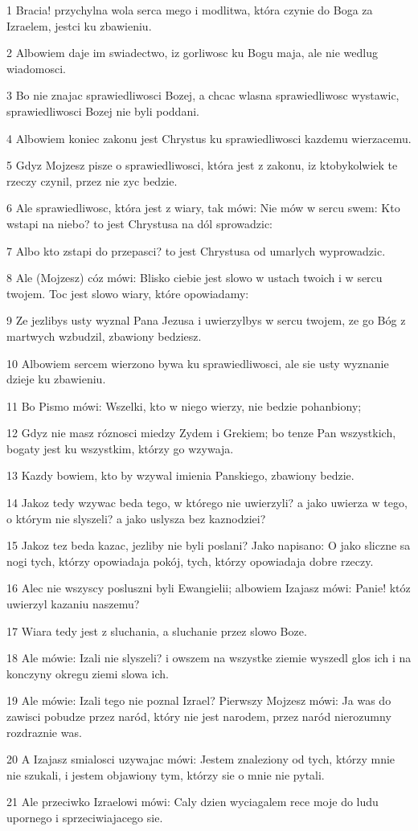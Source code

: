 \par 1 Bracia! przychylna wola serca mego i modlitwa, która czynie do Boga za Izraelem, jestci ku zbawieniu.
\par 2 Albowiem daje im swiadectwo, iz gorliwosc ku Bogu maja, ale nie wedlug wiadomosci.
\par 3 Bo nie znajac sprawiedliwosci Bozej, a chcac wlasna sprawiedliwosc wystawic, sprawiedliwosci Bozej nie byli poddani.
\par 4 Albowiem koniec zakonu jest Chrystus ku sprawiedliwosci kazdemu wierzacemu.
\par 5 Gdyz Mojzesz pisze o sprawiedliwosci, która jest z zakonu, iz ktobykolwiek te rzeczy czynil, przez nie zyc bedzie.
\par 6 Ale sprawiedliwosc, która jest z wiary, tak mówi: Nie mów w sercu swem: Kto wstapi na niebo? to jest Chrystusa na dól sprowadzic:
\par 7 Albo kto zstapi do przepasci? to jest Chrystusa od umarlych wyprowadzic.
\par 8 Ale (Mojzesz) cóz mówi: Blisko ciebie jest slowo w ustach twoich i w sercu twojem. Toc jest slowo wiary, które opowiadamy:
\par 9 Ze jezlibys usty wyznal Pana Jezusa i uwierzylbys w sercu twojem, ze go Bóg z martwych wzbudzil, zbawiony bedziesz.
\par 10 Albowiem sercem wierzono bywa ku sprawiedliwosci, ale sie usty wyznanie dzieje ku zbawieniu.
\par 11 Bo Pismo mówi: Wszelki, kto w niego wierzy, nie bedzie pohanbiony;
\par 12 Gdyz nie masz róznosci miedzy Zydem i Grekiem; bo tenze Pan wszystkich, bogaty jest ku wszystkim, którzy go wzywaja.
\par 13 Kazdy bowiem, kto by wzywal imienia Panskiego, zbawiony bedzie.
\par 14 Jakoz tedy wzywac beda tego, w którego nie uwierzyli? a jako uwierza w tego, o którym nie slyszeli? a jako uslysza bez kaznodziei?
\par 15 Jakoz tez beda kazac, jezliby nie byli poslani? Jako napisano: O jako sliczne sa nogi tych, którzy opowiadaja pokój, tych, którzy opowiadaja dobre rzeczy.
\par 16 Alec nie wszyscy posluszni byli Ewangielii; albowiem Izajasz mówi: Panie! któz uwierzyl kazaniu naszemu?
\par 17 Wiara tedy jest z sluchania, a sluchanie przez slowo Boze.
\par 18 Ale mówie: Izali nie slyszeli? i owszem na wszystke ziemie wyszedl glos ich i na konczyny okregu ziemi slowa ich.
\par 19 Ale mówie: Izali tego nie poznal Izrael? Pierwszy Mojzesz mówi: Ja was do zawisci pobudze przez naród, który nie jest narodem, przez naród nierozumny rozdraznie was.
\par 20 A Izajasz smialosci uzywajac mówi: Jestem znaleziony od tych, którzy mnie nie szukali, i jestem objawiony tym, którzy sie o mnie nie pytali.
\par 21 Ale przeciwko Izraelowi mówi: Caly dzien wyciagalem rece moje do ludu upornego i sprzeciwiajacego sie.

